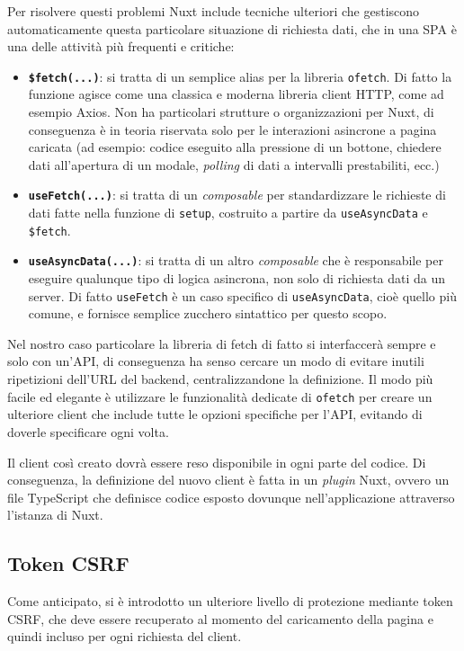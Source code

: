 Per risolvere questi problemi Nuxt include tecniche ulteriori che gestiscono automaticamente questa particolare situazione di richiesta dati, che in una SPA è una delle attività più frequenti e critiche:
\begin{itemize}
    \item \textbf{\texttt{\$fetch(...)}}: si tratta di un semplice alias per la libreria \texttt{ofetch}. Di fatto la funzione agisce come una classica e moderna libreria client HTTP, come ad esempio Axios. Non ha particolari strutture o organizzazioni per Nuxt, di conseguenza è in teoria riservata solo per le interazioni asincrone a pagina caricata (ad esempio: codice eseguito alla pressione di un bottone, chiedere dati all'apertura di un modale, \emph{polling} di dati a intervalli prestabiliti, ecc.)
    \item \textbf{\texttt{useFetch(...)}}: si tratta di un \emph{composable} per standardizzare le richieste di dati fatte nella funzione di \texttt{setup}, costruito a partire da \texttt{useAsyncData} e \texttt{\$fetch}.
    \item \textbf{\texttt{useAsyncData(...)}}: si tratta di un altro \emph{composable} che è responsabile per eseguire qualunque tipo di logica asincrona, non solo di richiesta dati da un server. Di fatto \texttt{useFetch} è un caso specifico di \texttt{useAsyncData}, cioè quello più comune, e fornisce semplice zucchero sintattico per questo scopo.
\end{itemize}

Nel nostro caso particolare la libreria di fetch di fatto si interfaccerà sempre e solo con un'API, di conseguenza ha senso cercare un modo di evitare inutili ripetizioni dell'URL del backend, centralizzandone la definizione. Il modo più facile ed elegante è utilizzare le funzionalità dedicate di \texttt{ofetch} per creare un ulteriore client che include tutte le opzioni specifiche per l'API, evitando di doverle specificare ogni volta.

Il client così creato dovrà essere reso disponibile in ogni parte del codice. Di conseguenza, la definizione del nuovo client è fatta in un \emph{plugin} Nuxt, ovvero un file TypeScript che definisce codice esposto dovunque nell'applicazione attraverso l'istanza di Nuxt.

\subsection{Token CSRF}
Come anticipato, si è introdotto un ulteriore livello di protezione mediante token CSRF, che deve essere recuperato al momento del caricamento della pagina e quindi incluso per ogni richiesta del client.

